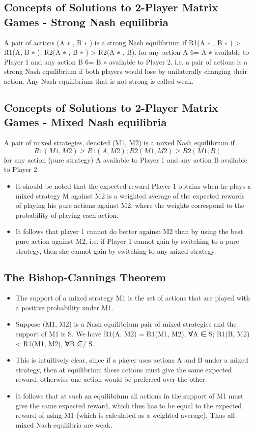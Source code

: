 \documentclass[]{report}
\begin{document}
\subsection{Concepts of Solutions to 2-Player Matrix Games - Strong
Nash equilibria}
A pair of actions (A
∗
, B
∗
) is a strong Nash equilibrium if
R1(A
∗
, B
∗
) > R1(A, B
∗
); R2(A
∗
, B
∗
) > R2(A
∗
, B).
for any action A 6= A
∗
available to Player 1 and any action B 6= B
∗
available to Player 2.
i.e. a pair of actions is a strong Nash equilibrium if both players
would lose by unilaterally changing their action.
Any Nash equilibrium that is not strong is called weak.
\subsection{Concepts of Solutions to 2-Player Matrix Games - Mixed
Nash equilibria}
A pair of mixed strategies, denoted (M1, M2) is a mixed Nash
equilibrium if
\[R1(M1, M2) ≥ R1(A, M2); R2(M1, M2) ≥ R2(M1, B)\]
for any action (pure strategy) A available to Player 1 and any
action B available to Player 2.
\begin{itemize}
	\item It should be noted that the expected reward Player 1 obtains when
	he plays a mixed strategy M against M2 is a weighted average of
	the expected rewards of playing his pure actions against M2, where
	the weights correspond to the probability of playing each action.
	\item It follows that player 1 cannot do better against M2 than by using
	the best pure action against M2, i.e. if Player 1 cannot gain by
	switching to a pure strategy, then she cannot gain by switching to
	any mixed strategy.
\end{itemize}

\subsection{The Bishop-Cannings Theorem}
\begin{itemize}
	\item The support of a mixed strategy M1 is the set of actions that are
	played with a positive probability under M1.
\item Suppose (M1, M2) is a Nash equilibrium pair of mixed strategies
	and the support of M1 is S. We have
	R1(A, M2) = R1(M1, M2), ∀A ∈ S; R1(B, M2) < R1(M1, M2), ∀B ∈/ S.
\item This is intuitively clear, since if a player uses actions A and B
	under a mixed strategy, then at equilibrium these actions must give
	the same expected reward, otherwise one action would be preferred
	over the other.
\item It follows that at such an equilibrium all actions in the support of
	M1 must give the same expected reward, which thus has to be
	equal to the expected reward of using M1 (which is calculated as a
	weighted average). Thus all mixed Nash equilibria are weak.
\end{itemize}
\end{document}
